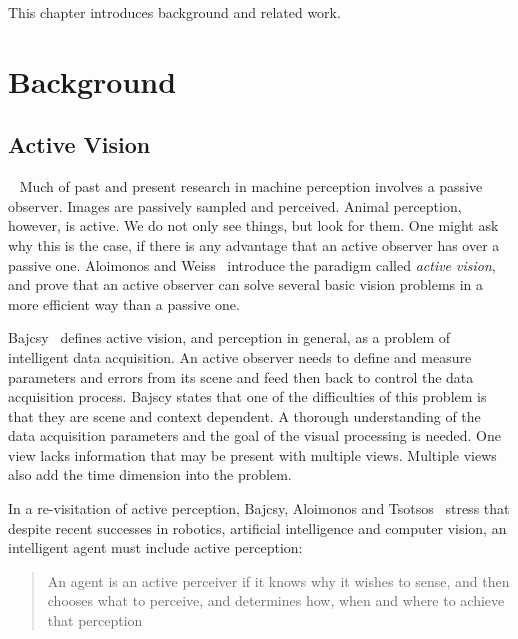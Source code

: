 This chapter introduces background and related work.


\section{Background}


\subsection{Active Vision}

~\cite{zeng_survey_2020}
Much of past and present research in machine perception involves a passive observer.
Images are passively sampled and perceived.
Animal perception, however, is active.
We do not only see things, but look for them.
One might ask why this is the case, if there is any advantage that an active observer has over a passive one.
Aloimonos and Weiss~\cite{aloimonos_active_1988} introduce the paradigm called \textit{active vision}, and prove that an active observer can solve several basic vision problems in a more efficient way than a passive one.

Bajcsy~\cite{bajcsy_1988} defines active vision, and perception in general, as a problem of intelligent data acquisition.
An active observer needs to define and measure parameters and errors from its scene and feed then back to control the data acquisition process.
Bajscy states that one of the difficulties of this problem is that they are scene and context dependent.
A thorough understanding of the data acquisition parameters and the goal of the visual processing is needed.
One view lacks information that may be present with multiple views.
Multiple views also add the time dimension into the problem.

In a re-visitation of active perception, Bajcsy, Aloimonos and Tsotsos~\cite{bajcsy_aloimonos_tsotsos_2018} stress that despite recent successes in robotics, artificial intelligence and computer vision, an intelligent agent must include active perception:

\begin{quote}
    An agent is an active perceiver if it knows why it wishes to sense, and then chooses what to perceive, and determines how, when and where to achieve that perception
\end{quote}~\cite{bajcsy_aloimonos_tsotsos_2018}


